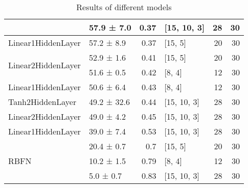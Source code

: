 \begin{table*}[h]
\begin{tabular}{llrlrr}
                                            & 57.9 ± 7.0  &  0.37 & [15, 10, 3]    &         28 &       30 \\
 \hline
Linear1HiddenLayer                  & 57.2 ± 8.9  &  0.37 & [15, 5]        &         20 &       30 \\
 \hline
\multirow{2}{*}{Linear2HiddenLayer} & 52.9 ± 1.6  &  0.41 & [15, 5]        &         20 &       30 \\
                                            & 51.6 ± 0.5  &  0.42 & [8, 4]         &         12 &       30 \\
 \hline
Linear1HiddenLayer                  & 50.6 ± 6.4  &  0.43 & [8, 4]         &         12 &       30 \\
 \hline
Tanh2HiddenLayer                    & 49.2 ± 32.6 &  0.44 & [15, 10, 3]    &         28 &       30 \\
 \hline
Linear2HiddenLayer                  & 49.0 ± 4.2  &  0.45 & [15, 10, 3]    &         28 &       30 \\
 \hline
Linear1HiddenLayer                  & 39.0 ± 7.4  &  0.53 & [15, 10, 3]    &         28 &       30 \\
 \hline
\multirow{3}{*}{RBFN}               & 20.4 ± 0.7  &  0.7  & [15, 5]        &         20 &       30 \\
                                            & 10.2 ± 1.5  &  0.79 & [8, 4]         &         12 &       30 \\
                                            & 5.0 ± 0.7   &  0.83 & [15, 10, 3]    &         28 &       30 \\
\hline
\end{tabular}
        \caption{Results of different models}
        \label{models}
    \end{table*}
    
